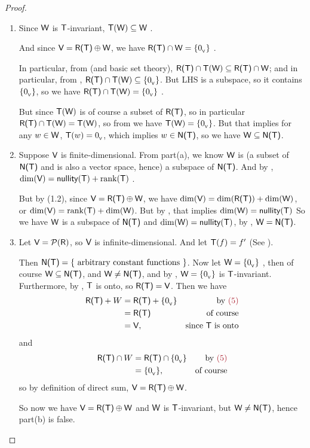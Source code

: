 \begin{proof} \ 
\begin{enumerate}
\item Since \(\textsf{W}\) is \(\textsf{T}\)-invariant, \(\textsf{T}(\textsf{W}) \subseteq \textsf{W}\) .

    And since \(\textsf{V} = \textsf{R(T)} \oplus \textsf{W}\), we have \(\textsf{R(T)}{} \cap \textsf{W} = \{ 0_{_{\textsf{V}}} \}\) .

    In particular, from  (and basic set theory), \(\textsf{R(T)}{} \cap \textsf{T}(\textsf{W}) \subseteq \textsf{R(T)}{} \cap \textsf{W}\);
    and in particular, from \MAROON{(2)}, \(\textsf{R(T)}{} \cap \textsf{T}(\textsf{W}) \subseteq \{ 0_{_{\textsf{V}}} \}\).
    But LHS is a subspace, so it contains \(\{ 0_{_{\textsf{V}}} \}\), so we have \(\textsf{R(T)}{} \cap \textsf{T}(\textsf{W}) = \{ 0_{_{\textsf{V}}} \}\) .

    But since \(\textsf{T}(\textsf{W})\) is of course a subset of \(\textsf{R(T)}\), so in particular \(\textsf{R(T)}{} \cap \textsf{T}(\textsf{W}) = \textsf{T}(\textsf{W})\), so from  we have \(\textsf{T}(\textsf{W}) = \{ 0_{_{\textsf{V}}} \}\).
    But that implies for any \(w \in \textsf{W}\), \(\textsf{T}(w) = 0_{_{\textsf{V}}}\), which implies \(w \in \textsf{N(T)}\), so we have \(\textsf{W} \subseteq \textsf{N(T)}\).

\item Suppose \(\textsf{V}\) is finite-dimensional.
    From part(a), we know \(\textsf{W}\) is (a subset of \(\textsf{N(T)}\) and is also a vector space, hence) a subspace of \(\textsf{N(T)}\).
    And by \THM{2.3}, \(\dim(\textsf{V}) = \textsf{nullity}(\textsf{T}) + \mathrm{rank}(\textsf{T})\) .

    But by (1.2), since \(\textsf{V} = \textsf{R(T)} \oplus \textsf{W}\), we have \(\dim(\textsf{V}) = \dim(\textsf{R(T)}) + \dim(\textsf{W})\), or \(\dim(\textsf{V}) = \mathrm{rank}(\textsf{T}) + \dim(\textsf{W})\).
    But by \MAROON{(4)}, that implies \(\dim(\textsf{W}) = \textsf{nullity}(\textsf{T})\)
    So we have \(\textsf{W}\) is a subspace of \(\textsf{N(T)}\) and \(\dim(\textsf{W}) = \textsf{nullity}(\textsf{T})\), by , \(\textsf{W} = \textsf{N(T)}\).

\item Let \(\textsf{V} = \mathcal{P}(\textsf{R})\), so \(\textsf{V}\) is infinite-dimensional.
    And let \(\textsf{T}(f) = f'\) (See \EXEC{2.1.16}).

    Then \(\textsf{N(T)} = \{ \text{ arbitrary constant functions } \}\).
    Now let \(\textsf{W} = \{ 0_{_{\textsf{V}}} \}\) \MAROON{(5)}, then of course \(\textsf{W} \subseteq \textsf{N(T)}\), and \(\textsf{W} \ne \textsf{N(T)}\), and by , \(\textsf{W} = \{ 0_{_{\textsf{V}}} \}\) is \(\textsf{T}\)-invariant.
    Furthermore, by \EXEC{2.1.16}, \(\textsf{T}\) is onto, so \(\textsf{R(T)} = \textsf{V}\).
    Then we have
    \begin{align*}
        \RANGET + W & = \RANGET + \{ \OV \} & \text{by \MAROON{(5)}} \\
                    & = \RANGET & \text{of course} \\
                    & = \V, & \text{since \(\T\) is onto} 
    \end{align*}
    and
    \begin{align*}
        \RANGET \cap W & = \RANGET \cap \{ \OV \} & \text{by \MAROON{(5)}} \\
                       & = \{ \OV \}, & \text{of course}
    \end{align*}
    so by definition of direct sum, \(\textsf{V} = \textsf{R(T)} \oplus \textsf{W}\).

    So now we have \(\textsf{V} = \textsf{R(T)} \oplus \textsf{W}\) and \(\textsf{W}\) is \(\textsf{T}\)-invariant, but \(\textsf{W} \ne \textsf{N(T)}\), hence part(b) is false.
\end{enumerate}
\end{proof}

